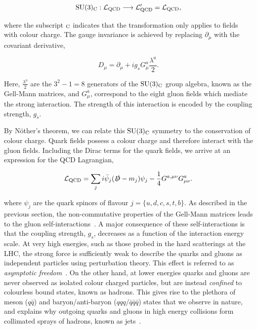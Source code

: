 \begin{equation}
    {\rm{SU}}(3)_{\rm{C}}: \mathcal{L}_{\rm{QCD}} \longrightarrow \mathcal{L}'_{\rm{QCD}} = \mathcal{L}_{\rm{QCD}},
\end{equation}

\noindent
where the subscript ${}_{\rm{C}}$ indicates that the transformation only applies to fields with colour charge. The gauge invariance is achieved by replacing $\partial_\mu$ with the covariant derivative, 

\begin{equation}
    D_\mu = \partial_\mu + i g_s G^a_\mu \frac{\lambda^a}{2}.
\end{equation}

\noindent
Here, $\frac{\lambda^a}{2}$ are the $3^2-1=8$ generators of the ${\rm{SU}}(3)_{\rm{C}}$ group algebra, known as the Gell-Mann matrices, and $G^a_\mu$, correspond to the eight gluon fields which mediate the strong interaction. The strength of this interaction is encoded by the coupling strength, $g_s$.

By N\"{o}ther's theorem, we can relate this ${\rm{SU}}(3)_{\rm{C}}$ symmetry to the conservation of colour charge. Quark fields possess a colour charge and therefore interact with the gluon fields. Including the Dirac terms for the quark fields, we arrive at an expression for the QCD Lagrangian,

\begin{equation}
    \mathcal{L}_{\rm{QCD}} = \sum_j i\bar{\psi}_j(\slashed{D}-m_j)\psi_j - \frac{1}{4} G^{a,\mu\nu}G^a_{\mu\nu}.
\end{equation}

\noindent
where $\psi_j$ are the quark spinors of flavour $j=\{u,d,c,s,t,b\}$. As described in the previous section, the non-commutative properties of the Gell-Mann matrices leads to the gluon self-interactions~\cite{Halzen:1984mc}. A major consequence of these self-interactions is that the coupling strength, $g_s$, decreases as a function of the interaction energy scale. At very high energies, such as those probed in the hard scatterings at the LHC, the strong force is sufficiently weak to describe the quarks and gluons as independent particles using perturbation theory. This effect is referred to as \textit{asymptotic freedom}~\cite{PhysRevLett.30.1343}. On the other hand, at lower energies quarks and gluons are never observed as isolated colour charged particles, but are instead \textit{confined} to colourless bound states, known as hadrons. This gives rise to the plethora of meson ($q\bar{q}$) and baryon/anti-baryon ($qqq/\bar{q}\bar{q}\bar{q}$) states that we observe in nature, and explains why outgoing quarks and gluons in high energy collisions form collimated sprays of hadrons, known as jets~\cite{Salam:2009jx}.

